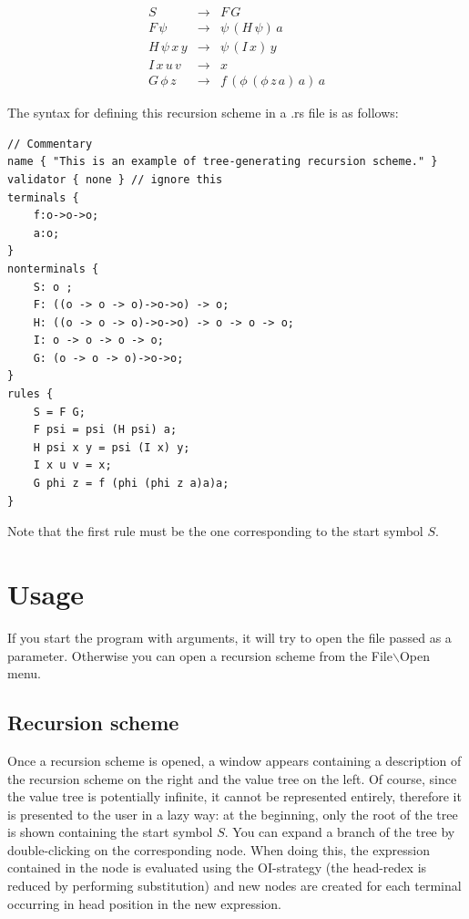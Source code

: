 \documentclass{article}
\begin{document}
\[\begin{array}{rll}
   S & \rightarrow & F\, G \\
    F\, \psi & \rightarrow &\psi\, (H\, \psi)\, a \\
    H\, \psi\, x\, y & \rightarrow & \psi\, (I\, x)\, y \\
    I\, x\, u\, v & \rightarrow & x \\
    G\, \phi\, z & \rightarrow &f\, (\phi\, (\phi\, z\, a)\,a)\,a
\end{array}\]

The syntax for defining this recursion scheme in a .rs file is as follows:

\begin{lstlisting}
// Commentary 
name { "This is an example of tree-generating recursion scheme." }
validator { none } // ignore this
terminals {
    f:o->o->o;
    a:o;
}
nonterminals {
    S: o ;
    F: ((o -> o -> o)->o->o) -> o;
    H: ((o -> o -> o)->o->o) -> o -> o -> o;
    I: o -> o -> o -> o;
    G: (o -> o -> o)->o->o;
}
rules {
    S = F G;
    F psi = psi (H psi) a;
    H psi x y = psi (I x) y;
    I x u v = x;
    G phi z = f (phi (phi z a)a)a;
}
\end{lstlisting}

Note that the first rule must be the one corresponding to the start symbol $S$.

\section{Usage}

If you start the program with arguments, it will try to open the file passed as a parameter. Otherwise
you can open a recursion scheme from the File$\backslash$Open menu.

\subsection{Recursion scheme}

Once a recursion scheme is opened, a window appears containing a description of the recursion scheme on the right and the value tree on the left. Of course, since the value tree is potentially infinite, it cannot be represented entirely, therefore it is presented to the user in a lazy way: at the beginning, only the root of the tree is shown containing the start symbol $S$. You can expand a branch of the tree by double-clicking on the corresponding node. When doing this, the expression contained in the node is evaluated using the OI-strategy (the head-redex is reduced by performing substitution) and new nodes are created for each terminal occurring in head position in the new expression.
\end{document}
